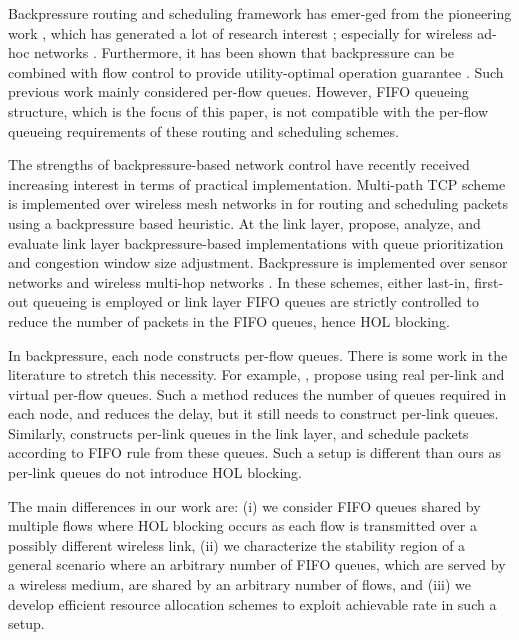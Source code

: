\documentclass[conference]{IEEEtran}
\begin{document}
Backpressure routing and scheduling framework has emer-ged from the pioneering work \cite{tass_eph1,tass_eph2}, which has generated a lot of research interest \cite{neely_book}; especially for wireless ad-hoc networks \cite{tass3,kahale,andrews,neely_mod_pow,stolyar_greedy,liu_stolyar}. Furthermore, it has been shown that backpressure can be combined with flow control to provide utility-optimal operation guarantee \cite{neely_mod,stolyar_greedy}. Such previous work mainly considered per-flow queues. However, FIFO queueing structure, which is the focus of this paper, is not compatible with the per-flow queueing requirements of these routing and scheduling schemes.

The strengths of backpressure-based network control have recently received increasing interest in terms of practical implementation. Multi-path TCP scheme is implemented over wireless mesh networks in \cite{horizon} for routing and scheduling packets using a backpressure based heuristic. At the link layer, \cite{DiffQ,umut_stolyar,sridharan2} propose, analyze, and evaluate link layer backpressure-based implementations with queue prioritization and congestion window size adjustment. Backpressure is implemented over sensor networks \cite{routing_wtht_routes} and wireless multi-hop networks \cite{xpress}. In these schemes, either last-in, first-out queueing is employed \cite{routing_wtht_routes} or link layer FIFO queues are strictly controlled \cite{xpress} to reduce the number of packets in the FIFO queues, hence HOL blocking.

In backpressure, each node constructs per-flow queues. There is some work in the literature to stretch this necessity. For example, \cite{pkt_by_pkt_adap_rout}, \cite{locbui} propose using real per-link and virtual per-flow queues. Such a method reduces the number of queues required in each node, and reduces the delay, but it still needs to construct per-link queues. Similarly, \cite{diffmax} constructs per-link queues in the link layer, and schedule packets according to FIFO rule from these queues. Such a setup is different than ours as per-link queues do not introduce HOL blocking. 

The main differences in our work are: (i) we consider FIFO queues shared by multiple flows where HOL blocking occurs as each flow is transmitted over a possibly different wireless link, (ii) we characterize the stability region of a general scenario where an arbitrary number of FIFO queues, which are served by a wireless medium, are shared by an arbitrary number of flows, and (iii) we develop efficient resource allocation schemes to exploit achievable rate in such a setup. 
\end{document}
